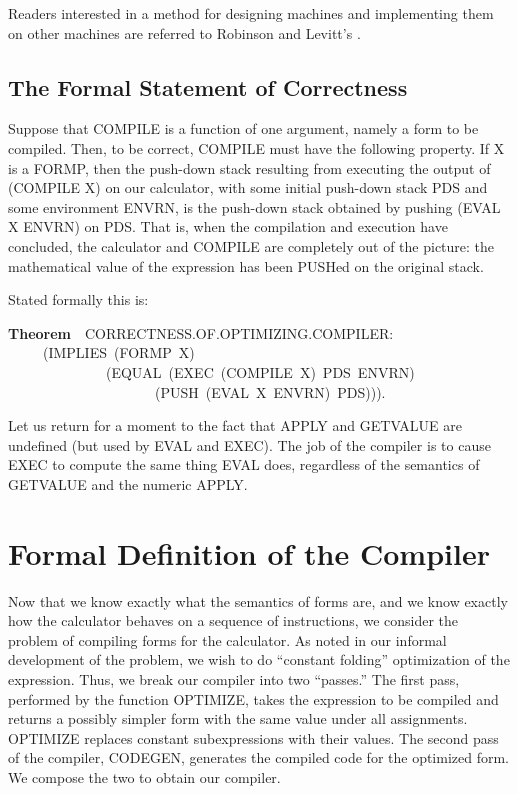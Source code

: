 \documentclass[10pt]{book}
\newenvironment{pubasis}{\begin{flushleft}}{\end{flushleft}}
\newcommand{\axiomordefinition}[1]{\vspace{6pt}\Large\textsf{\textbf{#1}}\normalsize}
\begin{document}
Readers interested in a method for designing machines and
implementing
them on other machines are referred to Robinson and Levitt's
\cite{LARRY}.

\subsection{The Formal Statement of Correctness}
Suppose that COMPILE is a function of one argument, namely a form
to be compiled.
Then, to be correct, COMPILE must have the following property.
If X is a FORMP, then the push-down stack resulting from executing the
output of (COMPILE X) on our calculator, with some initial push-down
stack PDS and some environment ENVRN, is   the push-down stack
obtained by pushing (EVAL X ENVRN) on PDS.  That is, when the compilation and execution have concluded,
the calculator and COMPILE are completely out of the picture:
the mathematical value of the expression has been PUSHed on the original
stack.

Stated formally this is:
\begin{pubasis}
\axiomordefinition{Theorem}~~CORRECTNESS.OF.OPTIMIZING.COMPILER:\\
~~~~~(IMPLIES~(FORMP~X)\\
~~~~~~~~~~~~~~(EQUAL~(EXEC~(COMPILE~X)~PDS~ENVRN)\\
~~~~~~~~~~~~~~~~~~~~~(PUSH~(EVAL~X~ENVRN)~PDS))).\\
\end{pubasis}
Let us return for a moment to the fact that APPLY and GETVALUE are
undefined (but used by EVAL and EXEC).  The job of the compiler
is to cause EXEC to compute the same thing EVAL
does, regardless of the semantics of GETVALUE and the numeric APPLY.
\section{Formal Definition of the Compiler}
Now that we know exactly what the semantics of forms are, and we know
exactly how the calculator behaves on a sequence of instructions, we
consider the problem of compiling forms for the calculator.
As noted in our informal development of the problem, we wish to
do ``constant folding'' optimization of the expression.  Thus, we 
break our compiler into two ``passes.''  The first pass, performed
by the function OPTIMIZE, takes the expression to be compiled and returns a
possibly simpler
form with the same value under all assignments.  OPTIMIZE replaces constant
subexpressions with their values.
The second pass of the compiler, CODEGEN,
generates the compiled code for the optimized form.  We
compose the two to obtain our compiler.
\end{document}
